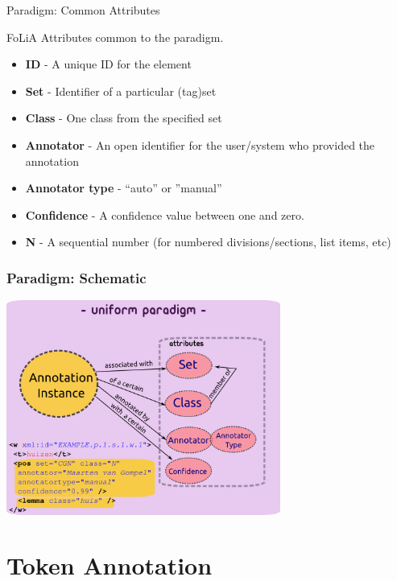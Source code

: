 \documentclass[compress]{beamer}
\begin{document}
        
\begin{frame}
    \begin{block}{Paradigm: Common Attributes}
            
        FoLiA Attributes common to the paradigm.
        \begin{itemize}
            \item \textbf{ID} - A unique ID for the element
            \item \textbf{Set} - Identifier of a particular (tag)set
            \item \textbf{Class} - One class from the specified set
            \item \textbf{Annotator} - An open identifier for the user/system who provided the annotation
            \item \textbf{Annotator type} - ``auto'' or ''manual''
            \item \textbf{Confidence} - A confidence value between one and zero.
            \item \textbf{N} - A sequential number (for numbered divisions/sections, list items, etc)            
        \end{itemize}
            
    \end{block}
\end{frame}


\begin{frame}
        \frametitle{Paradigm: Schematic}
        \begin{center}
        \includegraphics[width=90.0mm]{paradigm.png}
        \end{center}
\end{frame}


\section{Token Annotation}
\end{document}
